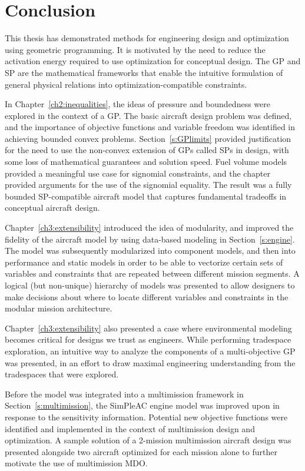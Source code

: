 \chapter{Conclusion}
\label{ch5:conclusion}

This thesis has demonstrated methods for engineering design and optimization
using geometric programming. It
is motivated by the need to reduce the activation energy required to use
optimization for conceptual design. The \gls{GP} and \gls{SP} are the
mathematical frameworks that enable the intuitive formulation of general
physical relations into optimization-compatible constraints.

In Chapter~\ref{ch2:inequalities}, the ideas of pressure and boundedness were
explored in the context of a \gls{GP}. The basic aircraft design problem was defined,
and the importance of objective functions and variable freedom
was identified in achieving bounded convex problems.
Section~\ref{s:GPlimits} provided justification for the need to use the non-convex
extension of \gls{GP}s called \gls{SP}s in design, with some loss of mathematical
guarantees and solution speed. Fuel volume models provided a meaningful use
case for signomial constraints, and the chapter provided arguments for the use of the signomial
equality. The result was a fully bounded \gls{SP}-compatible aircraft model that captures
fundamental tradeoffs in conceptual aircraft design.

Chapter~\ref{ch3:extensibility} introduced the idea of modularity, and improved
the fidelity of the aircraft model by using data-based modeling in Section~\ref{s:engine}.
The model was subsequently modularized
into component models, and then into performance and static models in order to
be able to vectorize certain sets of variables and constraints that are repeated between
different mission segments. A logical (but non-unique) hierarchy of models
was presented to allow designers to make decisions about where to locate different variables
and constraints in the modular mission architecture.

Chapter~\ref{ch3:extensibility} also presented a case where environmental modeling becomes critical
for designs we trust as engineers. While performing tradespace exploration, an intuitive
way to analyze the components of a multi-objective \gls{GP} was presented, in
an effort to draw maximal engineering understanding from the tradespaces that were explored.

Before the model was integrated into a multimission framework in Section~\ref{s:multimission},
the SimPleAC engine model was improved upon
in response to the sensitivity information. Potential
new objective functions were identified and implemented in the context of multimission design
and optimization.
A sample solution of a 2-mission multimission aircraft design
was presented alongside two aircraft optimized for each mission alone to further motivate
the use of multimission \gls{MDO}.

